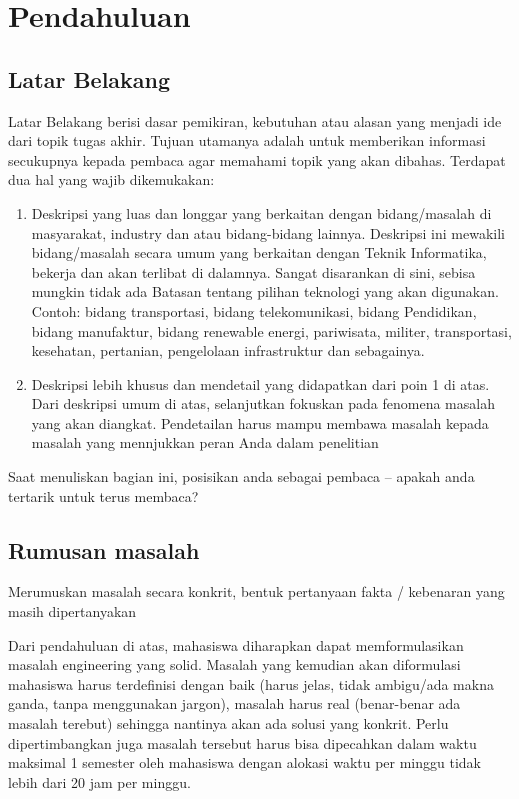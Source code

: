 \newpage
\chapter{Pendahuluan} \label{Bab I}

\section{Latar Belakang} \label{I.Latar Belakang}
Latar Belakang berisi dasar pemikiran, kebutuhan atau alasan yang menjadi ide dari topik tugas akhir. Tujuan utamanya adalah untuk memberikan informasi secukupnya kepada pembaca agar memahami topik yang akan dibahas. Terdapat dua hal yang wajib dikemukakan: \par 
\begin{enumerate}
	\item Deskripsi yang luas dan longgar yang berkaitan dengan bidang/masalah di masyarakat, industry dan atau bidang-bidang lainnya. Deskripsi ini mewakili bidang/masalah secara umum yang berkaitan dengan Teknik Informatika, bekerja dan akan terlibat di dalamnya. Sangat disarankan di sini, sebisa mungkin tidak ada Batasan tentang pilihan teknologi yang akan digunakan. Contoh: bidang transportasi, bidang telekomunikasi, bidang Pendidikan, bidang manufaktur, bidang renewable energi, pariwisata, militer, transportasi, kesehatan, pertanian, pengelolaan infrastruktur dan sebagainya.
	\item Deskripsi lebih khusus dan mendetail yang didapatkan dari poin 1 di atas. Dari deskripsi umum di atas, selanjutkan fokuskan pada fenomena masalah yang akan diangkat. Pendetailan harus mampu membawa masalah kepada masalah yang mennjukkan peran Anda dalam penelitian 
\end{enumerate}

Saat menuliskan bagian ini, posisikan anda sebagai pembaca – apakah anda tertarik untuk terus membaca? \par

\section{Rumusan masalah} \label{I.Rumusan Masalah}
\indent Merumuskan masalah secara konkrit, bentuk pertanyaan fakta / kebenaran yang masih dipertanyakan \par

Dari pendahuluan di atas, mahasiswa diharapkan dapat memformulasikan masalah engineering yang solid. Masalah yang kemudian akan diformulasi mahasiswa harus terdefinisi dengan baik (harus jelas, tidak ambigu/ada makna ganda, tanpa menggunakan jargon), masalah harus real (benar-benar ada masalah terebut) sehingga nantinya akan ada solusi yang konkrit. Perlu dipertimbangkan juga masalah tersebut harus bisa dipecahkan dalam waktu maksimal 1 semester oleh mahasiswa dengan alokasi waktu per minggu tidak lebih dari 20 jam per minggu. \par

